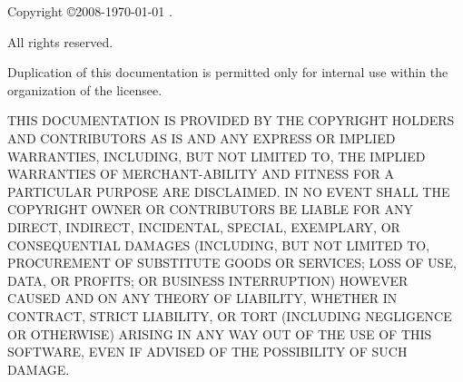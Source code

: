\clearpage{}

Copyright \copyright 2008-{\theyear\today} \company.

All rights reserved.

Duplication of this documentation is permitted
only for internal use within the organization of the licensee.

THIS DOCUMENTATION IS PROVIDED BY THE COPYRIGHT
HOLDERS AND CONTRIBUTORS \textquotedbl{}AS IS\textquotedbl{} AND ANY
EXPRESS OR IMPLIED WARRANTIES, INCLUDING, BUT NOT LIMITED TO, THE
IMPLIED WARRANTIES OF MERCHANT-ABILITY AND FITNESS FOR A PARTICULAR
PURPOSE ARE DISCLAIMED. IN NO EVENT SHALL THE COPYRIGHT OWNER OR CONTRIBUTORS
BE LIABLE FOR ANY DIRECT, INDIRECT, INCIDENTAL, SPECIAL, EXEMPLARY,
OR CONSEQUENTIAL DAMAGES (INCLUDING, BUT NOT LIMITED TO, PROCUREMENT
OF SUBSTITUTE GOODS OR SERVICES; LOSS OF USE, DATA, OR PROFITS; OR
BUSINESS INTERRUPTION) HOWEVER CAUSED AND ON ANY THEORY OF LIABILITY,
WHETHER IN CONTRACT, STRICT LIABILITY, OR TORT (INCLUDING NEGLIGENCE
OR OTHERWISE) ARISING IN ANY WAY OUT OF THE USE OF THIS SOFTWARE,
EVEN IF ADVISED OF THE POSSIBILITY OF SUCH DAMAGE.

\vfill{}


